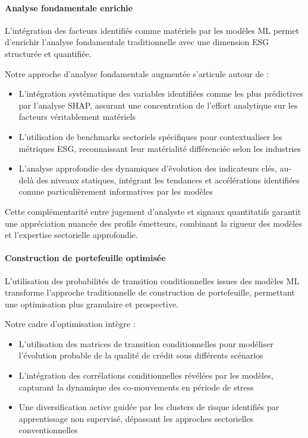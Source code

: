\paragraph{Analyse fondamentale enrichie}

L'intégration des facteurs identifiés comme matériels par les modèles ML permet d'enrichir l'analyse fondamentale traditionnelle avec une dimension ESG structurée et quantifiée.

Notre approche d'analyse fondamentale augmentée s'articule autour de :
\begin{itemize}
    \item L'intégration systématique des variables identifiées comme les plus prédictives par l'analyse SHAP, assurant une concentration de l'effort analytique sur les facteurs véritablement matériels
    \item L'utilisation de benchmarks sectoriels spécifiques pour contextualiser les métriques ESG, reconnaissant leur matérialité différenciée selon les industries
    \item L'analyse approfondie des dynamiques d'évolution des indicateurs clés, au-delà des niveaux statiques, intégrant les tendances et accélérations identifiées comme particulièrement informatives par les modèles
\end{itemize}

Cette complémentarité entre jugement d'analyste et signaux quantitatifs garantit une appréciation nuancée des profils émetteurs, combinant la rigueur des modèles et l'expertise sectorielle approfondie.

\paragraph{Construction de portefeuille optimisée}

L'utilisation des probabilités de transition conditionnelles issues des modèles ML transforme l'approche traditionnelle de construction de portefeuille, permettant une optimisation plus granulaire et prospective.

Notre cadre d'optimisation intègre :
\begin{itemize}
    \item L'utilisation des matrices de transition conditionnelles pour modéliser l'évolution probable de la qualité de crédit sous différents scénarios
    \item L'intégration des corrélations conditionnelles révélées par les modèles, capturant la dynamique des co-mouvements en période de stress
    \item Une diversification active guidée par les clusters de risque identifiés par apprentissage non supervisé, dépassant les approches sectorielles conventionnelles
\end{itemize}

